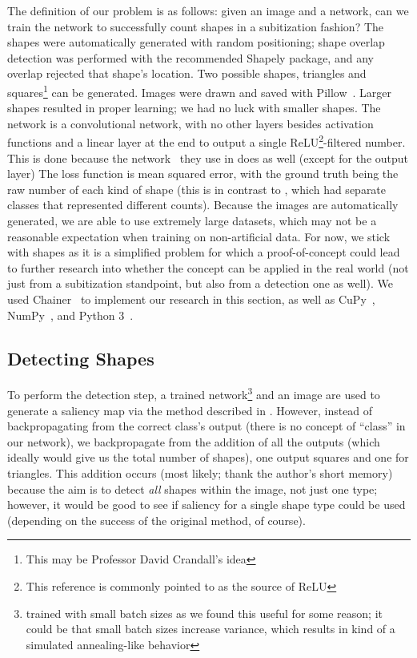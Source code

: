 The definition of our problem is as follows: given an image and a network, can we train the network
to successfully count shapes in a subitization fashion? The shapes were automatically generated with
random positioning; shape overlap detection was performed with the recommended\cite{viaforshapely}
Shapely\cite{shapely} package, and any overlap rejected that shape's location. Two possible shapes,
triangles and squares\footnote{This may be Professor David Crandall's idea} can be generated. Images
were drawn and saved with Pillow~\cite{imagesinpython}. Larger shapes resulted in proper learning;
we had no luck with smaller shapes. The network is a convolutional network, with no other layers
besides activation functions and a linear layer at the end to output a single
ReLU\cite{pmlr-v15-glorot11a}\footnote{This reference is commonly pointed to as the source of
ReLU}-filtered number. This is done because the network~\cite{szegedy2014going} they use in \cite{10.1007/978-3-319-46487-9_48} does as well
(except for the output layer) The loss function is mean squared error, with the ground truth being the raw
number of each kind of shape (this is in contrast to \cite{Zhang_2015_CVPR}, which had separate
classes that represented different counts). Because the images are automatically generated, we are
able to use extremely large datasets, which may not be a reasonable expectation when training on
non-artificial data. For now, we stick with shapes as it is a simplified problem for which a
proof-of-concept could lead to further research into whether the concept can be applied in the real
world (not just from a subitization standpoint, but also from a detection one as well). We used
Chainer~\cite{tokui2019chainer} to implement our research in this section, as well as
CuPy~\cite{cupy_learningsys2017}, NumPy~\cite{2020NumPy-Array}, and Python 3~\cite{language}.

\subsection{Detecting Shapes}
\label{detectingshapes}

To perform the detection step, a trained network\footnote{trained with small batch sizes as we found
this useful for some reason; it could be that small batch sizes increase variance, which results in
kind of a simulated annealing-like behavior} and an image are used to generate a saliency map via
the method described in \cite{simonyan2014deep}. However, instead of backpropagating from the
correct class's output (there is no concept of ``class'' in our network), we backpropagate from the
addition of all the outputs (which ideally would give us the total number of shapes), one output
squares and one for triangles. This addition occurs (most likely; thank the author's short memory)
because the aim is to detect \textit{all} shapes within the image, not just one type; however, it
would be good to see if saliency for a single shape type could be used (depending on the success of
the original method, of course).

